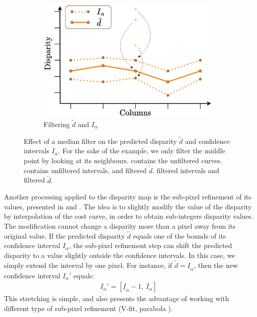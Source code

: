\begin{figure}
\begin{subfigure}[t]{0.32\linewidth}
        \includegraphics[width=\linewidth]{Images/Chap_5/Median_filtering_3.png}
        \caption{Filtering $\tilde{d}$ and $I_\alpha$}
        \label{fig:median_filtering_3}
    \end{subfigure}
    \caption{Effect of a median filter on the predicted disparity $\tilde{d}$ and confidence intervals $I_\alpha$. For the sake of the example, we only filter the middle point by looking at its neighbours.  contains the unfiltered curves.  contains unfiltered intervals, and filtered $\tilde{d}$.  filtered intervals and filtered $\tilde{d}$.}
    \label{fig:median_filtering}
\end{figure}

Another processing applied to the disparity map is the sub-pixel refinement of its values, presented in  and . The idea is to slightly modify the value of the disparity by interpolation of the cost curve, in order to obtain sub-integers disparity values. The modification cannot change a disparity more than a pixel away from its original value. If the predicted disparity $\tilde{d}$ equals one of the bounds of its confidence interval $I_\alpha$, the sub-pixel refinement step can shift the predicted disparity to a value slightly outside the confidence intervals. In this case, we simply extend the interval by one pixel. For instance, if $\tilde{d}=\underline{I}_\alpha$, then the new confidence interval $I_\alpha'$ equals:
\begin{align}
    I_\alpha'=[\underline{I}_\alpha-1,~\overline{I}_\alpha]
\end{align}
This stretching is simple, and also presents the advantage of working with different type of sub-pixel refinement (\ie V-fit, parabola \etc).


